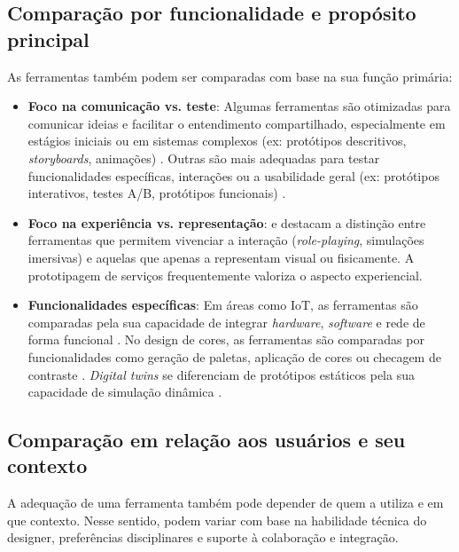 \subsection{Comparação por funcionalidade e propósito principal}

As ferramentas também podem ser comparadas com base na sua função primária:

\begin{itemize}
	\item \textbf{Foco na comunicação vs. teste}: Algumas ferramentas são otimizadas para comunicar ideias e facilitar o entendimento compartilhado, especialmente em estágios iniciais ou em sistemas complexos (ex: protótipos descritivos, \textit{storyboards}, animações) \cite{wang2023smartproducts, lee2023industry, paust2025integrative}. Outras são mais adequadas para testar funcionalidades específicas, interações ou a usabilidade geral (ex: protótipos interativos, testes A/B, protótipos funcionais) \cite{villa2022integratedcare, asbjornsen2022echange, Kim2024}.
	
	\item \textbf{Foco na experiência vs. representação}:  e  destacam a distinção entre ferramentas que permitem vivenciar a interação (\textit{role-playing}, simulações imersivas) e aquelas que apenas a representam visual ou fisicamente. A prototipagem de serviços frequentemente valoriza o aspecto experiencial.
	
	\item \textbf{Funcionalidades específicas}: Em áreas como IoT, as ferramentas são comparadas pela sua capacidade de integrar \textit{hardware}, \textit{software} e rede de forma funcional \cite{Kim2024}. No design de cores, as ferramentas são comparadas por funcionalidades como geração de paletas, aplicação de cores ou checagem de contraste \cite{hegemann2024palette}. \textit{Digital twins} se diferenciam de protótipos estáticos pela sua capacidade de simulação dinâmica \cite{mager2023product}.
	
\end{itemize}

\subsection{Comparação em relação aos usuários e seu contexto}

A adequação de uma ferramenta também pode depender de quem a utiliza e em que contexto. Nesse sentido, podem variar com base na habilidade técnica do designer, preferências disciplinares e suporte à colaboração e integração.

